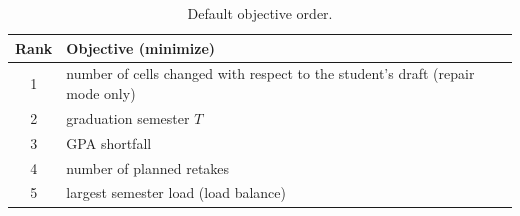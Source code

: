 \begin{table}[ht]
\centering
\small
\begin{tabular}{@{}cp{11.5cm}@{}}
\toprule
\textbf{Rank} & \textbf{Objective (minimize)} \\
\midrule
1 & number of cells changed with respect to the student's draft (repair mode only) \\
2 & graduation semester $T$ \\
3 & GPA shortfall \\
4 & number of planned retakes \\
5 & largest semester load (load balance) \\
\bottomrule
\end{tabular}
\caption{Default objective order.}
\label{tab:objectives}
\end{table}